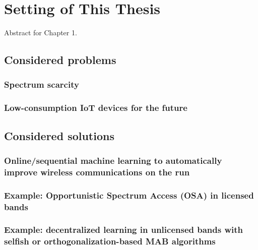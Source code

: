 
\chapter{Setting of This Thesis}
\label{chapter:1}
\minitoc

Abstract for Chapter 1.

\newpage
\graphicspath{{2-Chapters/1-Chapter/Images/}}

\section{Considered problems}
\label{sec:1:problems}

\subsection{Spectrum scarcity}


\subsection{Low-consumption IoT devices for the future}


\section{Considered solutions}
\label{sec:1:solutions}


\subsection{Online/sequential machine learning to automatically improve wireless communications on the run}

\subsection{Example: Opportunistic Spectrum Access (OSA) in licensed bands}

\subsection{Example: decentralized learning in unlicensed bands with selfish or orthogonalization-based MAB algorithms}


